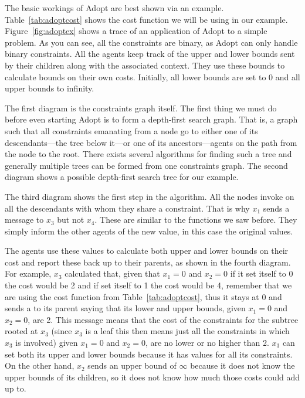 The basic workings of Adopt are best shown via an example.
Table~\ref{tab:adoptcost} shows the cost function we will be using in
our example.  Figure~\ref{fig:adoptex} shows a trace of an application
of Adopt to a simple problem. As you can see, all the constraints are
binary, as Adopt can only handle binary constraints. All the agents
keep track of the upper and lower bounds sent by their children along
with the associated context.  They use these bounds to calculate
bounds on their own costs.  Initially, all lower bounds are set to 0
and all upper bounds to infinity.

The first diagram is the constraints graph itself. The first thing we
must do before even starting Adopt is to form a depth-first search
graph. That is, a graph such that all constraints emanating from a
node go to either one of its descendants---the tree below it---or one
of its ancestors---agents on the path from the node to the root. There
exists several algorithms for finding such a tree and generally
multiple trees can be formed from one constraints graph. The second
diagram shows a possible depth-first search tree for our example.

The third diagram shows the first step in the algorithm. All the nodes
invoke  on all the descendants with whom they share
a constraint. That is why $x_1$ sends a message to $x_3$ but not
$x_4$. These  are similar to the 
functions we saw before. They simply inform the other agents of the
new value, in this case the original values.

 The agents use these values to calculate both upper
and lower bounds on their cost and report these back up to their
parents, as shown in the fourth diagram. For example, $x_3$ calculated
that, given that $x_1=0$ and $x_2=0$ if it set itself to 0 the cost
would be 2 and if set itself to 1 the cost would be 4, remember that
we are using the cost function from Table~\ref{tab:adoptcost}, thus
it stays at 0 and sends a  to its parent saying that
its lower and upper bounds, given $x_1=0$ and $x_2=0$, are 2. This
message means that the cost of the constraints for the subtree rooted
at $x_3$ (since $x_3$ is a leaf this then means just all the
constraints in which $x_3$ is involved) given $x_1=0$ and $x_2=0$, are
no lower or no higher than 2.  $x_3$ can set both its upper and lower
bounds because it has values for all its constraints.  On the other
hand, $x_2$ sends an upper bound of $\infty$ because it does not know
the upper bounds of its children, so it does not know how much those
costs could add up to.

